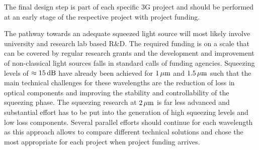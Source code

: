 The final design step is part of each specific 3G project and should be performed at an early stage of the respective project with project funding.

The pathway towards an adequate squeezed light source will most likely involve university and research lab based R\&D. The required funding is on a scale that can be covered by regular research grants and the development and improvement of non-classical light sources falls in standard calls of funding agencies. Squeezing levels of $ \approx 15 \, {\rm dB} $ have already been achieved for  $ 1\, {\rm \mu m}$ and  $ 1.5\, {\rm \mu m}$ such that the main technical challenges for these wavelengths are the reduction of loss in optical components and  improving the stability and controllability of the squeezing phase. The squeezing research at $ 2\, {\rm \mu m}$ is far less advanced and substantial effort has to be put into the generation of high squeezing levels and low loss components. Several parallel efforts should continue for each wavelength as this approach allows to compare different technical solutions and chose the most appropriate for each project when project funding arrives.

